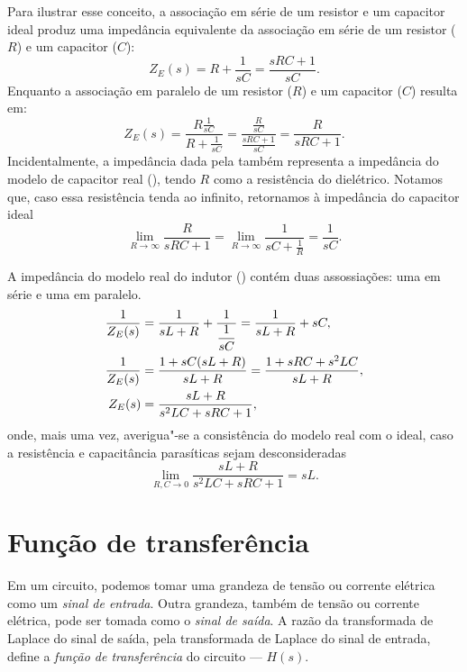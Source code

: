 Para ilustrar esse conceito, a associação em série de um resistor e um capacitor ideal produz uma impedância equivalente da associação em série de um resistor ($R$) e um capacitor ($C$):
\begin{equation}\label{eq:serieRC}
	Z_E(s)=R+\frac{1}{sC}=\frac{sRC+1}{sC}.
\end{equation}
Enquanto a associação em paralelo de um resistor ($R$) e um capacitor ($C$) resulta em:
\begin{equation}\label{eq:paraleloRC}
	Z_E(s)=\frac{\displaystyle R\frac{1}{sC}}{\displaystyle R+\frac{1}{sC}}=\frac{\displaystyle\frac{R}{sC}}{\displaystyle\frac{sRC+1}{sC}}=\frac{R}{sRC+1}.
\end{equation}
Incidentalmente, a impedância dada pela  também representa a impedância do modelo de capacitor real (), tendo $R$ como a resistência do dielétrico. Notamos que, caso essa resistência tenda ao infinito, retornamos à impedância do capacitor ideal
\begin{equation*}
	\lim_{R\to\infty}\frac{R}{sRC+1}=\lim_{R\to\infty}\frac{1}{\displaystyle sC+\frac{1}{R}}=\frac{1}{sC}.
\end{equation*}

A impedância do modelo real do indutor () contém duas assossiações: uma em série e uma em paralelo.
\begin{align}
	\frac{1}{Z_E(s)}&=\frac{1}{sL+R}+\frac{1}{\displaystyle\frac{1}{sC}}=\frac{1}{sL+R}+sC\notag,\\
	\frac{1}{Z_E(s)}&=\frac{1+sC(sL+R)}{sL+R}=\frac{1+sRC+s^2LC}{sL+R}\notag,\\
	Z_E(s)&=\frac{sL+R}{s^2LC+sRC+1},
\end{align}
onde, mais uma vez, averigua"-se a consistência do modelo real com o ideal, caso a resistência e capacitância parasíticas sejam desconsideradas
\begin{equation*}
	\lim_{R,C\to0}\frac{sL+R}{s^2LC+sRC+1}=sL.
\end{equation*}

\section{Função de transferência}
Em um circuito, podemos tomar uma grandeza de tensão ou corrente elétrica como um \emph{sinal de entrada}. Outra grandeza, também de tensão ou corrente elétrica, pode ser tomada como o \emph{sinal de saída}. A razão da transformada de Laplace do sinal de saída, pela transformada de Laplace do sinal de entrada, define a \emph{função de transferência} do circuito --- $H(s)$.

